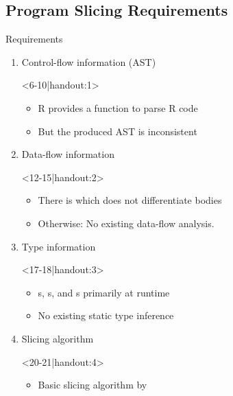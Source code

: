 \def\After#1{\quad\textcolor{gray}{\scriptsize#1}}
\subsection{Program Slicing Requirements}
\begin{frame}[c,fragile]{Requirements}%
\vspace*{2mm}\begin{enumerate}
   \itemsep12pt
   \item<2-> Control-flow information (AST) \onslide<11-|handout:2->{\After{partially}}\begin{onlyenv}<6-10|handout:1>
         \begin{itemize}
         \item<6-> R provides a  function to parse R code
         \item<7-> But the produced AST is inconsistent
      \end{itemize}
   \end{onlyenv}
   \item<3-> Data-flow information \onslide<14-|handout:3->{\After{nothing}}\begin{onlyenv}<12-15|handout:2>
      \begin{itemize}
      \item<12-> There is \textsuperscript{\color{gray}\cite{lang_codedepends_2018}} which does not differentiate bodies
      \item<13-> Otherwise: No existing data-flow analysis.
   \end{itemize}
\end{onlyenv}
   \item<4-> Type information \onslide<17-|handout:4->{\After{nothing}}\begin{onlyenv}<17-18|handout:3>
      \begin{itemize}
      \item<17-> s, s, and s primarily at runtime
      \item<18-> No existing static type inference
   \end{itemize}
\end{onlyenv}
   \item<5-> Slicing algorithm \onslide<20-|handout:5->{\After{algorithm}}\begin{onlyenv}<20-21|handout:4>
      \begin{itemize}
      \item<20-> Basic slicing algorithm by \citeauthor{weiser_program_1984}\textsuperscript{\color{gray}\cite{weiser_program_1984}}%

\end{itemize}
\end{onlyenv}
\end{enumerate}
\end{frame}
